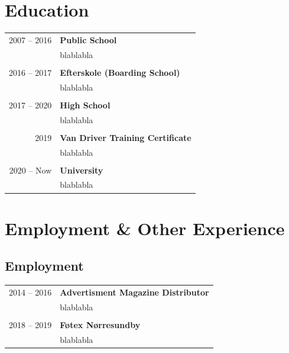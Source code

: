 \documentclass{article}
\begin{document}
    \section*{Education}
    \begin{tabular}{r|p{.82\linewidth}} %
        2007 -- 2016 & \textbf{Public School}\\
    &   blablabla
        \\\\
        2016 -- 2017 & \textbf{Efterskole (Boarding School)}\\
    &   blablabla
        \\\\
        2017 -- 2020 & \textbf{High School}\\
    &   blablabla
        \\\\
        2019 & \textbf{Van Driver Training Certificate }\\
    &   blablabla
        \\\\
        2020 -- Now & \textbf{University}\\
    &   blablabla
    \end{tabular}
 
    \section*{Employment \& Other Experience}
    \subsection*{Employment}
    \begin{tabular}{r|p{.82\linewidth}}%
        2014 -- 2016 & \textbf{Advertisment Magazine Distributor}\\
    &   blablabla
        \\\\
        2018 -- 2019 & \textbf{Føtex Nørresundby}\\
    &   blablabla
    \end{tabular}
\end{document}

